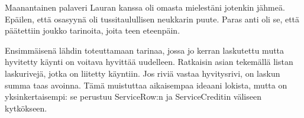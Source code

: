 Maanantainen palaveri Lauran kanssa oli omasta mielestäni jotenkin
jähmeä. Epäilen, että osasyynä oli tussitaulullisen neukkarin puute.
Paras anti oli se, että päätettiin joukko tarinoita, joita teen
eteenpäin.

Ensimmäisenä lähdin toteuttamaan tarinaa, jossa jo kerran laskutettu
mutta hyvitetty käynti on voitava hyvittää uudelleen. Ratkaisin asian
tekemällä listan laskurivejä, jotka on liitetty käyntiin. Jos riviä
vastaa hyvitysrivi, on laskun summa taas avoinna. Tämä muistuttaa
aikaisempaa ideaani lokista, mutta on yksinkertaisempi: se perustuu
ServiceRow:n ja ServiceCreditin väliseen kytkökseen.

